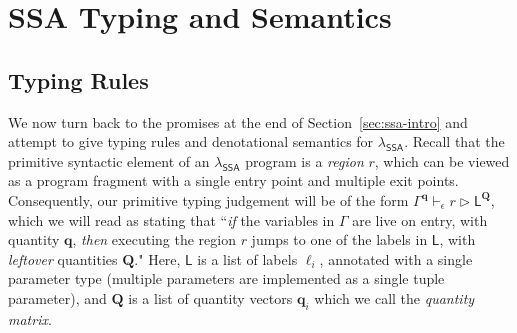 \documentclass[acmsmall,screen,review]{acmart}
\newcommand{\mc}[1]{\ensuremath{\mathcal{#1}}}
\newcommand{\mb}[1]{\ensuremath{\mathbf{#1}}}
\newcommand{\ms}[1]{\ensuremath{\mathsf{#1}}}
\newcommand{\hasty}[4]{#1 \vdash_{#2} #3: {#4}}
\newcommand{\haslb}[4]{#1 \vdash_{#2} #3 \rhd #4}
\newcommand{\teqv}{\approx}
\newcommand{\tref}{\twoheadrightarrow}
\newcommand{\tmle}[5]{#1 \vdash_{#2} #3 \tref #4 : {#5}}
\newcommand{\tmeq}[5]{#1 \vdash_{#2} #3 \teqv #4 : {#5}}
\newcommand{\dnt}[1]{\llbracket{#1}\rrbracket}
\newcommand{\isotopessa}{\(\lambda_{\ms{SSA}}\)}
\begin{document}

\section{SSA Typing and Semantics}

\subsection{Typing Rules}

We now turn back to the promises at the end of Section~\ref{sec:ssa-intro} and attempt to give 
typing rules and denotational semantics for \isotopessa{}. Recall that the primitive syntactic 
element of an \isotopessa{} program is a \emph{region} $r$, which can be viewed as a program 
fragment with a single entry point and multiple exit points. Consequently, our primitive typing 
judgement will be of the form
$
  \haslb{\Gamma^{\mb{q}}}{\epsilon}{r}{\ms{L}^{\mb{Q}}}
$,
which we will read as stating  that ``\emph{if} the variables in $\Gamma$ are live on entry, with
quantity $\mb{q}$, \emph{then} executing the region $r$ jumps to one of the labels in $\ms{L}$, with
\emph{leftover} quantities $\mb{Q}$." Here, $\ms{L}$ is a list of labels $\ell_i$, annotated with a
single parameter type (multiple parameters are implemented as a single tuple parameter), and
$\mb{Q}$ is a list of quantity vectors $\mb{q}_i$ which we call the \emph{quantity matrix}.
\end{document}
